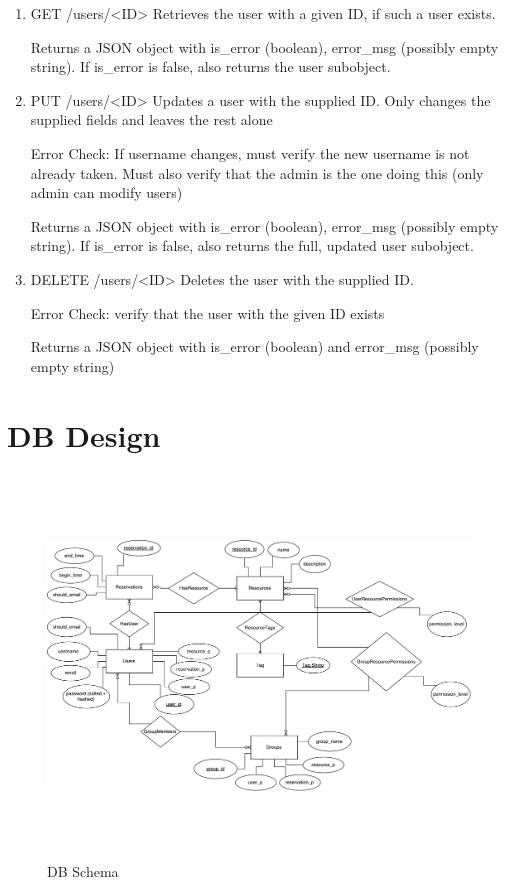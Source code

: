 \documentclass[12pt]{article}
\begin{document}
\begin{enumerate}
\item GET /users/<ID>
Retrieves the user with a given ID, if such a user exists. 

Returns a JSON object with is\_error (boolean), error\_msg (possibly empty string). If is\_error is false, also returns the user subobject. 

\item PUT /users/<ID>
Updates a user with the supplied ID. Only changes the supplied fields and leaves the rest alone

Error Check: If username changes, must verify the new username is not already taken. Must also verify that the admin is the one doing this (only admin can modify users)

Returns a JSON object with is\_error (boolean), error\_msg (possibly empty string). If is\_error is false, also returns the full, updated user subobject. 

\item DELETE /users/<ID>
Deletes the user with the supplied ID. 

Error Check: verify that the user with the given ID exists

Returns a JSON object with is\_error (boolean) and error\_msg (possibly empty string)
\end{enumerate}

\clearpage
\section{DB Design}
\label{appendix:DBDesign}
\begin{figure}[h]
\begin{center}
\includegraphics[height=4in]{Evolution2DB.pdf}
\end{center}
\caption{DB Schema}
\end{figure}
\end{document}
